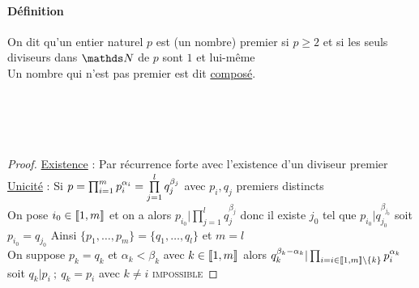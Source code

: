 		\paragraph{Définition} On dit qu'un entier naturel $p$ est (un nombre) premier si $p\geq 2$ et si les seuls diviseurs dans $\N$ de $p$ sont 
		$1$ et lui-même \trait \vspace*{-1.2cm} \\ Un nombre qui n'est pas premier est dit \underline{composé}. 
		\vspace*{0.5cm} \\ 
		\vspace*{0.5cm} \\ 
		\vspace*{0.5cm} \\ 
		\vspace*{0.5cm} \\ 
		\vspace*{0.5cm} \\ 
		\begin{proof}
		\underline{Existence} : Par récurrence forte avec l'existence d'un diviseur premier %
        \\
		\underline{Unicité} : Si $p=\prod_{i= 1 }^{m} p_i^{\alpha_i} = \prod\limits_{j=1}^l q_j^{\beta_j}$ avec $p_i,q_j$ premiers distincts \\
		On pose $i_0\in\llbracket 1,m \rrbracket$ et on a alors $p_{i_0} | \prod_{j=1}^l q_j^{\beta_j}$ donc il existe $j_0$ tel que $p_{i_0} | 
		q_{j_0}^{\beta_{j_0}}$ soit $p_{i_0}=q_{j_0}$ Ainsi $\{p_1,\dots ,p_m\} = \{q_1,\dots ,q_l\}$ et $m=l$\\
		On suppose $p_k=q_k$ et $\alpha_k<\beta_k$ avec $k\in\llbracket 1,m \rrbracket$ alors $q_k^{\beta_k-\alpha_k} | \prod_{i= i\in\llbracket 1,m \rrbracket\backslash \{k\}  }^{}
		p_i^{\alpha_k}$ soit $q_k | p_i ~;~q_k = p_i$ avec $k\neq i$ \textsc{impossible}
		\end{proof} \traitd
